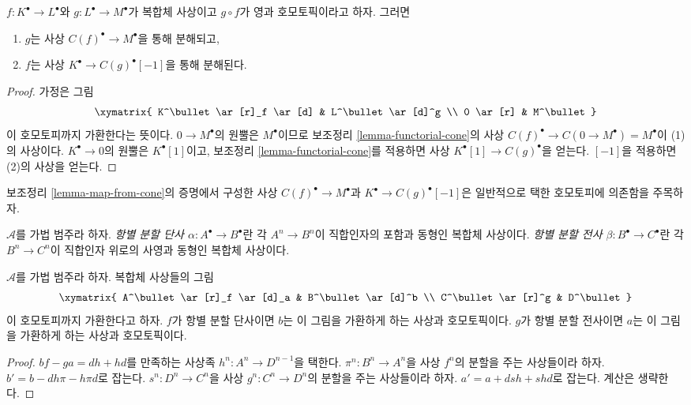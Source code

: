 \begin{lemma}
\label{lemma-map-from-cone}
$f: K^\bullet \to L^\bullet$와 $g : L^\bullet \to M^\bullet$가
복합체 사상이고 $g \circ f$가 영과 호모토픽이라고 하자. 그러면
\begin{enumerate}
\item $g$는 사상 $C(f)^\bullet \to M^\bullet$을 통해 분해되고,
\item $f$는 사상 $K^\bullet \to C(g)^\bullet[-1]$을 통해 분해된다.
\end{enumerate}
\end{lemma}

\begin{proof}
가정은 그림
$$
\xymatrix{
K^\bullet \ar[r]_f \ar[d] & L^\bullet \ar[d]^g \\
0 \ar[r] & M^\bullet
}
$$
이 호모토피까지 가환한다는 뜻이다. $0 \to M^\bullet$의 원뿔은
$M^\bullet$이므로 보조정리 \ref{lemma-functorial-cone}의 사상
$C(f)^\bullet \to C(0 \to M^\bullet) = M^\bullet$이 (1)의 사상이다.
$K^\bullet \to 0$의 원뿔은 $K^\bullet[1]$이고, 보조정리
\ref{lemma-functorial-cone}를 적용하면 사상
$K^\bullet[1] \to C(g)^\bullet$을 얻는다. $[-1]$을 적용하면
(2)의 사상을 얻는다.
\end{proof}

\noindent
보조정리 \ref{lemma-map-from-cone}의 증명에서 구성한 사상
$C(f)^\bullet \to M^\bullet$과 $K^\bullet \to C(g)^\bullet[-1]$은
일반적으로 택한 호모토피에 의존함을 주목하자.

\begin{definition}
\label{definition-termwise-split-map}
$\mathcal{A}$를 가법 범주라 하자.
{\it 항별 분할 단사 $\alpha : A^\bullet \to B^\bullet$}란 각
$A^n \to B^n$이 직합인자의 포함과 동형인 복합체 사상이다.
{\it 항별 분할 전사 $\beta : B^\bullet \to C^\bullet$}란 각
$B^n \to C^n$이 직합인자 위로의 사영과 동형인 복합체 사상이다.
\end{definition}

\begin{lemma}
\label{lemma-make-commute-map}
$\mathcal{A}$를 가법 범주라 하자. 복합체 사상들의 그림
$$
\xymatrix{
A^\bullet \ar[r]_f \ar[d]_a & B^\bullet \ar[d]^b \\
C^\bullet \ar[r]^g & D^\bullet
}
$$
이 호모토피까지 가환한다고 하자. $f$가 항별 분할 단사이면
$b$는 이 그림을 가환하게 하는 사상과 호모토픽이다.
$g$가 항별 분할 전사이면 $a$는 이 그림을 가환하게 하는 사상과
호모토픽이다.
\end{lemma}

\begin{proof}
$bf - ga = dh + hd$를 만족하는 사상족
$h^n : A^n \to D^{n - 1}$을 택한다.
$\pi^n : B^n \to A^n$을 사상 $f^n$의 분할을 주는 사상들이라 하자.
$b' = b - dh\pi - h\pi d$로 잡는다.
$s^n : D^n \to C^n$을 사상 $g^n : C^n \to D^n$의 분할을 주는
사상들이라 하자. $a' = a + dsh + shd$로 잡는다.
계산은 생략한다.
\end{proof}

